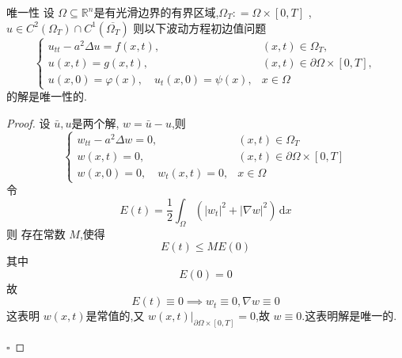 \documentclass[../../main.tex]{subfiles}
\begin{document}
\begin{corollary}{唯一性}
    设 \(   \Omega \subseteq \mathbb{R} ^{n}  \)是有光滑边界的有界区域,\(   \Omega _{T}: =   \Omega \times \left[ 0,T \right]   \) ,  \(  u\in C^{2}\left(  \Omega _{T} \right)\cap C^{1}\left( \overline{ \Omega _{T}} \right)    \)  则以下波动方程初边值问题 \[
    \begin{cases} u_{tt}-a^{2} \Delta u= f\left( x,t \right),&\left( x,t \right)\in  \Omega _{T},\\ 
     u\left( x,t \right)= g\left( x,t \right) ,&\left( x,t \right)\in  \partial  \Omega \times \left[ 0,T \right],\\ 
      u\left( x,0 \right)=  \varphi \left( x \right),\quad u_{t}\left( x,0 \right)= \psi \left( x \right),&x\in  \Omega           \end{cases} 
    \]的解是唯一性的.
\end{corollary}
\begin{proof}
    设 \(  \bar{u},u  \)是两个解, \(  w= \bar{u}-u  \),则 \[
    \begin{cases} w_{tt}-a^{2} \Delta w= 0,&\left( x,t \right)\in  \Omega _{T}\\ 
     w\left( x,t \right)= 0,&\left( x,t \right) \in  \partial  \Omega \times \left[ 0,T \right]\\ 
      w\left( x,0 \right)= 0,\quad w_{t}\left( x,t \right)= 0,&x \in  \Omega        \end{cases} 
    \]  令 \[
    E\left( t \right)= \frac{1}{2}\int_{ \Omega }\left( \left| w_{t} \right|^{2}+  \left|  \nabla w \right|^{2} \right) \,\mathrm{d} x   
    \]则 存在常数 \(  M  \),使得 \[
    E\left( t \right)\le ME\left( 0 \right)  
    \] 其中 \[
    E\left( 0 \right)= 0 
    \]故 \[
    E\left( t \right)\equiv 0 \implies w_{t}\equiv 0,  \nabla w\equiv 0 
    \]这表明 \(  w\left( x,t \right)   \)是常值的,又 \(  w\left( x,t \right)|_{ \partial  \Omega \times \left[ 0,T \right] }= 0   \),故 \(  w\equiv 0  \).这表明解是唯一的.   

    \hfill $\square$
\end{proof}
\end{document}
